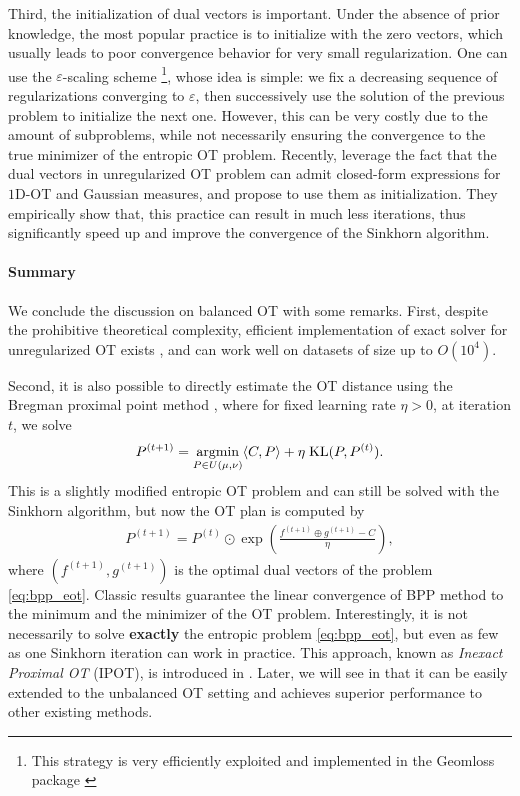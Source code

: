 Third, the initialization of dual vectors is important.
Under the absence of prior knowledge, the most popular practice is to initialize with
the zero vectors, which usually leads to poor convergence behavior for very small regularization.
One can use the $\varepsilon$-scaling scheme \citep{Schmitzer19}
\footnote{This strategy is very efficiently exploited and implemented in the Geomloss package
\citep{Feydy19}}, whose idea is simple: we fix a decreasing sequence of regularizations
converging to $\varepsilon$, then successively use the solution of the previous problem to
initialize the next one. However, this can be very costly due to the amount of subproblems,
while not necessarily ensuring the convergence to the true minimizer of the entropic OT problem.
Recently, \citep{Thornton23a} leverage the fact that the dual vectors in unregularized OT problem
can admit closed-form expressions for $1$D-OT and Gaussian measures, and propose to use them
as initialization. They empirically show that, this practice can result in much less iterations,
thus significantly speed up and improve the convergence of the Sinkhorn algorithm.

\paragraph{Summary} \label{para:summary}
We conclude the discussion on balanced OT with some remarks.
First, despite the prohibitive theoretical complexity,
efficient implementation of exact solver for unregularized OT exists \citep{Flamary21},
and can work well on datasets of size up to $O(10^4)$.

Second, it is also possible to directly estimate the OT distance using the
Bregman proximal point method \citep{Chen93,Teboulle97}, where for fixed learning rate $\eta > 0$,
at iteration $t$, we solve
\begin{align}
  \label{eq:bpp_eot}
  P^{(t+1)} = \operatorname*{argmin}_{P \in U(\mu, \nu)} \langle C, P \rangle + \eta \; \text{KL}(P, P^{(t)}).
\end{align}
This is a slightly modified entropic OT problem and can still be solved with the
Sinkhorn algorithm, but now the OT plan is computed by
\begin{align*}
  P^{(t+1)} = P^{(t)} \odot \exp \left( \frac{f^{(t+1)} \oplus g^{(t+1)} - C}{\eta} \right),
\end{align*}
where $(f^{(t+1)}, g^{(t+1)})$ is the optimal dual vectors of the problem \ref{eq:bpp_eot}.
Classic results \citep{Chen93} guarantee the linear convergence of BPP method
to the minimum and the minimizer of the OT problem.
Interestingly, it is not necessarily to solve \textbf{exactly} the entropic problem \ref{eq:bpp_eot},
but even as few as one Sinkhorn iteration can work in practice.
This approach, known as \textit{Inexact Proximal OT} (IPOT), is introduced in \citep{Xie20}.
Later, we will see in  that it can be easily extended to the unbalanced OT setting
and achieves superior performance to other existing methods.

